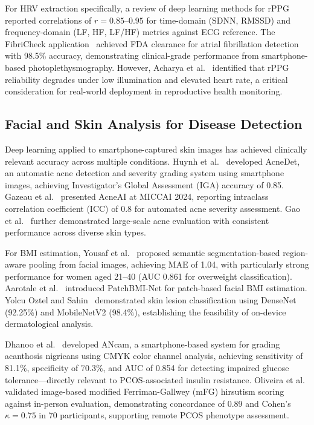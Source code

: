 \documentclass[conference]{IEEEtran}
\begin{document}
For HRV extraction specifically, a review of deep learning methods for rPPG~\cite{rppgreview2024frontiers} reported correlations of $r=0.85$--$0.95$ for time-domain (SDNN, RMSSD) and frequency-domain (LF, HF, LF/HF) metrics against ECG reference. The FibriCheck application~\cite{Sollee_2025} achieved FDA clearance for atrial fibrillation detection with 98.5\% accuracy, demonstrating clinical-grade performance from smartphone-based photoplethysmography. However, Acharya et al.~\cite{acharya2025reliability} identified that rPPG reliability degrades under low illumination and elevated heart rate, a critical consideration for real-world deployment in reproductive health monitoring.

\subsection{Facial and Skin Analysis for Disease Detection}

Deep learning applied to smartphone-captured skin images has achieved clinically relevant accuracy across multiple conditions. Huynh et al.~\cite{Huynh_2022} developed AcneDet, an automatic acne detection and severity grading system using smartphone images, achieving Investigator's Global Assessment (IGA) accuracy of 0.85. Gazeau et al.~\cite{Gazeau_2024} presented AcneAI at MICCAI 2024, reporting intraclass correlation coefficient (ICC) of 0.8 for automated acne severity assessment. Gao et al.~\cite{Gao_2025} further demonstrated large-scale acne evaluation with consistent performance across diverse skin types.

For BMI estimation, Yousaf et al.~\cite{Yousaf_2021} proposed semantic segmentation-based region-aware pooling from facial images, achieving MAE of 1.04, with particularly strong performance for women aged 21--40 (AUC 0.861 for overweight classification). Aarotale et al.~\cite{Aarotale_2023} introduced PatchBMI-Net for patch-based facial BMI estimation. Yolcu Oztel and Sahin~\cite{Oztel_2023} demonstrated skin lesion classification using DenseNet (92.25\%) and MobileNetV2 (98.4\%), establishing the feasibility of on-device dermatological analysis.

Dhanoo et al.~\cite{Dhanoo_2024} developed ANcam, a smartphone-based system for grading acanthosis nigricans using CMYK color channel analysis, achieving sensitivity of 81.1\%, specificity of 70.3\%, and AUC of 0.854 for detecting impaired glucose tolerance---directly relevant to PCOS-associated insulin resistance. Oliveira et al.~\cite{Oliveira_2022} validated image-based modified Ferriman-Gallwey (mFG) hirsutism scoring against in-person evaluation, demonstrating concordance of 0.89 and Cohen's $\kappa = 0.75$ in 70 participants, supporting remote PCOS phenotype assessment.
\end{document}
